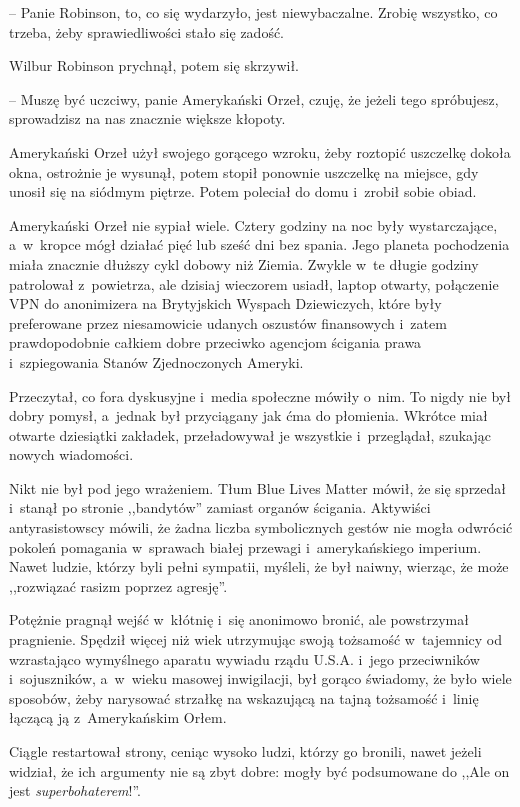 \documentclass[oneside,polish,11pt,sfheadings]{mwbk}
\begin{document}
-- Panie Robinson, to, co się wydarzyło, jest niewybaczalne. Zrobię
wszystko, co trzeba, żeby sprawiedliwości stało się zadość.

Wilbur Robinson prychnął, potem się skrzywił. 

-- Muszę być uczciwy, panie
Amerykański Orzeł, czuję, że jeżeli tego spróbujesz, sprowadzisz na nas
znacznie większe kłopoty.

Amerykański Orzeł użył swojego gorącego wzroku, żeby roztopić uszczelkę
dokoła okna, ostrożnie je wysunął, potem stopił ponownie uszczelkę na
miejsce, gdy unosił się na siódmym piętrze. Potem poleciał do domu i~zrobił sobie obiad.

Amerykański Orzeł nie sypiał wiele. Cztery godziny na noc były
wystarczające, a~w~kropce mógł działać pięć lub sześć dni bez spania.
Jego planeta pochodzenia miała znacznie dłuższy cykl dobowy niż Ziemia.
Zwykle w~te długie godziny patrolował z~powietrza, ale dzisiaj wieczorem
usiadł, laptop otwarty, połączenie VPN do anonimizera na Brytyjskich
Wyspach Dziewiczych, które były preferowane przez niesamowicie udanych
oszustów finansowych i~zatem prawdopodobnie całkiem dobre przeciwko
agencjom ścigania prawa i~szpiegowania Stanów Zjednoczonych Ameryki.

Przeczytał, co fora dyskusyjne i~media społeczne mówiły o~nim. To nigdy
nie był dobry pomysł, a~jednak był przyciągany jak ćma do płomienia.
Wkrótce miał otwarte dziesiątki zakładek, przeładowywał je wszystkie i~przeglądał, szukając nowych wiadomości.

Nikt nie był pod jego wrażeniem. Tłum Blue Lives Matter mówił, że się
sprzedał i~stanął po stronie ,,bandytów'' zamiast organów ścigania.
Aktywiści antyrasistowscy mówili, że żadna liczba symbolicznych gestów
nie mogła odwrócić pokoleń pomagania w~sprawach białej przewagi i~amerykańskiego imperium. Nawet ludzie, którzy byli pełni sympatii,
myśleli, że był naiwny, wierząc, że może ,,rozwiązać rasizm poprzez
agresję''.

Potężnie pragnął wejść w~kłótnię i~się anonimowo bronić, ale powstrzymał
pragnienie. Spędził więcej niż wiek utrzymując swoją tożsamość w~tajemnicy od wzrastająco wymyślnego aparatu wywiadu rządu U.S.A. i~jego
przeciwników i~sojuszników, a~w~wieku masowej inwigilacji, był gorąco
świadomy, że było wiele sposobów, żeby narysować strzałkę na wskazującą
na tajną tożsamość i~linię łączącą ją z~Amerykańskim Orłem.

Ciągle restartował strony, ceniąc wysoko ludzi, którzy go bronili, nawet
jeżeli widział, że ich argumenty nie są zbyt dobre: mogły być
podsumowane do ,,Ale on jest \textit{superbohaterem}!''.
\end{document}
